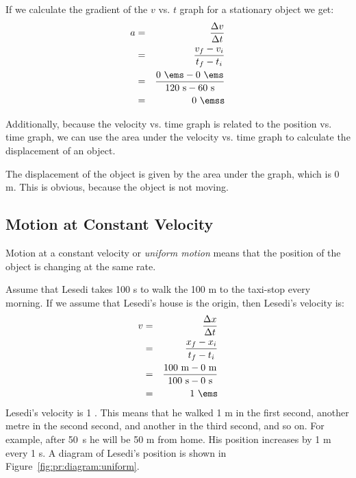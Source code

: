 
If we calculate the gradient of the $v$ vs. $t$ graph for a stationary object we get:
\begin{eqnarray*}
{a}&=&\frac{\Delta v}{\Delta t}\\
&=&\frac{v_f - v_i}{ t_f - t_i }\\
&=&\frac{0\ \ems - 0\ \ems}{ 120~\rm{s} - 60~\rm{s} }\\
&=&0\ \emss
\end{eqnarray*}

Additionally, because the velocity vs. time graph is related to the position vs. time graph, we can use the area under the velocity vs. time graph to calculate the displacement of an object.


The displacement of the object is given by the area under the graph, which is 0 m. This is obvious, because the object is not moving.

\subsection{Motion at Constant Velocity}
Motion at a constant velocity or \textit{uniform motion} means that the position of the object is changing at the same rate.

Assume that Lesedi takes 100 s to walk the 100 m to the taxi-stop every morning. If we assume that Lesedi's house is the origin, then Lesedi's velocity is:
\begin{eqnarray*}
{v}&=&\frac{\Delta x}{\Delta t}\\
&=&\frac{x_f - x_i}{t_f-t_i}\\
&=&\frac{100\ \mathrm{m} - 0\ \mathrm{m}}{100\ \mathrm{s} - 0\ \mathrm{s}}\\
&=&1\ \ems
\end{eqnarray*}
Lesedi's velocity is 1 \ms. This means that he walked 1 m in the first second, another metre in the second second, and another in the third second, and so on. For example, after 50~s he will be 50 m from home. His position increases by 1 m every 1 s. A diagram of Lesedi's position is shown in Figure~\ref{fig:pr:diagram:uniform}.\\



